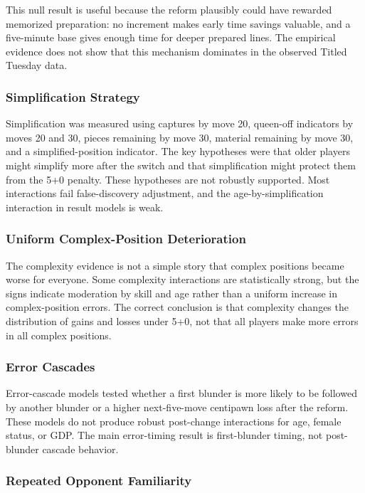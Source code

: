 This null result is useful because the reform plausibly could have rewarded memorized preparation: no increment makes early time savings valuable, and a five-minute base gives enough time for deeper prepared lines. The empirical evidence does not show that this mechanism dominates in the observed Titled Tuesday data.

\subsubsection{Simplification Strategy}

Simplification was measured using captures by move 20, queen-off indicators by moves 20 and 30, pieces remaining by move 30, material remaining by move 30, and a simplified-position indicator. The key hypotheses were that older players might simplify more after the switch and that simplification might protect them from the 5+0 penalty. These hypotheses are not robustly supported. Most interactions fail false-discovery adjustment, and the age-by-simplification interaction in result models is weak.

\subsubsection{Uniform Complex-Position Deterioration}

The complexity evidence is not a simple story that complex positions became worse for everyone. Some complexity interactions are statistically strong, but the signs indicate moderation by skill and age rather than a uniform increase in complex-position errors. The correct conclusion is that complexity changes the distribution of gains and losses under 5+0, not that all players make more errors in all complex positions.

\subsubsection{Error Cascades}

Error-cascade models tested whether a first blunder is more likely to be followed by another blunder or a higher next-five-move centipawn loss after the reform. These models do not produce robust post-change interactions for age, female status, or GDP. The main error-timing result is first-blunder timing, not post-blunder cascade behavior.

\subsubsection{Repeated Opponent Familiarity}

